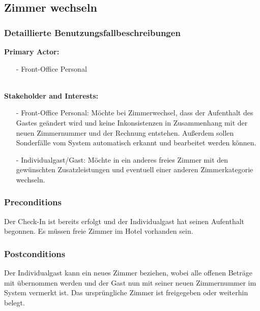 \documentclass[./detailed_overview_usecases.tex]{subfiles}
\begin{document}
    \subsection{Zimmer wechseln}
    \subsubsection{Detaillierte Benutzungsfallbeschreibungen}

    \textbf{Primary Actor:}
    \begin{itemize}
        \item [-]  Front-Office Personal
    \end{itemize}
    \\
    \textbf{Stakeholder and Interests:}
    \begin{itemize}
        \item[-] Front-Office Personal: Möchte bei Zimmerwechsel, dass der Aufenthalt des Gastes geändert wird und keine Inkonsistenzen in Zusammenhang mit der neuen
        Zimmernummer und der Rechnung entstehen. Außerdem sollen Sonderfälle vom System automatisch erkannt und bearbeitet werden können.
        \item[-] Individualgast/Gast: Möchte in ein anderes freies Zimmer mit den gewünschten Zusatzleistungen und eventuell einer anderen Zimmerkategorie wechseln.
    \end{itemize}

    \subsubsection*{Preconditions}
    Der Check-In ist bereits erfolgt und der Individualgast hat seinen Aufenthalt begonnen. Es müssen freie Zimmer im Hotel vorhanden sein.

    \subsubsection*{Postconditions}
    Der Individualgast kann ein neues Zimmer beziehen, wobei alle offenen Beträge mit übernommen werden und der Gast nun mit
    seiner neuen Zimmernummer im System vermerkt ist. Das ursprüngliche Zimmer ist freigegeben oder weiterhin belegt.
\end{document}
